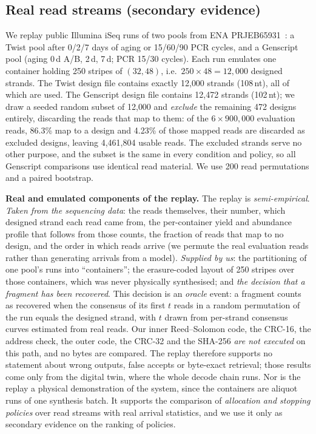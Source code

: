 \documentclass[acmsmall,screen]{acmart}
\begin{document}
\subsection{Real read streams (secondary evidence)}
We replay public Illumina iSeq runs of two pools from ENA PRJEB65931~\cite{gimpel2023digital,gimpel2023prjeb65931}:
a Twist pool after 0/2/7 days of aging or 15/60/90 PCR cycles, and a Genscript pool (aging 0\,d A/B,
2\,d, 7\,d; PCR 15/30 cycles).  Each run emulates one container holding 250 stripes of $(32,48)$,
i.e.\ $250\times48=12{,}000$ designed strands.  The Twist design file contains exactly 12{,}000
strands (108\,nt), all of which are used.  The Genscript design file contains 12{,}472 strands
(102\,nt); we draw a seeded random subset of 12{,}000 and \emph{exclude} the remaining 472 designs
entirely, discarding the reads that map to them: of the $6\times900{,}000$ evaluation reads, 86.3\%
map to a design and 4.23\% of those mapped reads are discarded as excluded designs, leaving
4{,}461{,}804 usable reads.  The excluded strands serve no other purpose, and the subset is the same
in every condition and policy, so all Genscript comparisons use identical read material.  We use 200
read permutations and a paired bootstrap.

\textbf{Real and emulated components of the replay.}  The replay is \emph{semi-empirical}.
\emph{Taken from the sequencing data}: the reads themselves, their number, which designed strand each
read came from, the per-container yield and abundance profile that follows from those counts, the
fraction of reads that map to no design, and the order in which reads arrive (we permute the real
evaluation reads rather than generating arrivals from a model).  \emph{Supplied by us}: the
partitioning of one pool's runs into ``containers''; the erasure-coded layout of 250 stripes over those
containers, which was never physically synthesised; and \emph{the decision that a fragment has been
recovered}.  This decision is an \emph{oracle} event: a fragment counts as recovered when the consensus
of its first $t$ reads in a random permutation of the run equals the designed strand, with $t$ drawn
from per-strand consensus curves estimated from real reads.  Our inner Reed--Solomon code, the CRC-16,
the address check, the outer code, the CRC-32 and the SHA-256 \emph{are not executed} on this path, and
no bytes are compared.  The replay therefore supports no statement about wrong outputs, false accepts or
byte-exact retrieval; those results come only from the digital twin, where the whole decode chain runs.
Nor is the replay a physical demonstration of the system, since the containers are aliquot runs of one
synthesis batch.  It supports the comparison of \emph{allocation and stopping policies} over read
streams with real arrival statistics, and we use it only as secondary evidence on the ranking of
policies.
\end{document}
